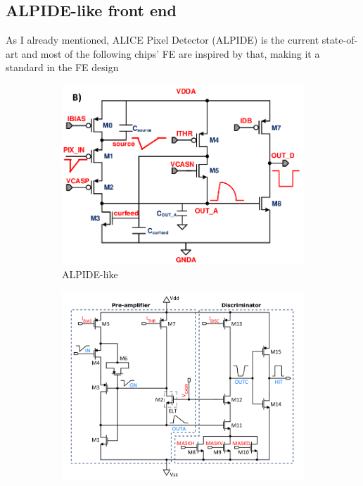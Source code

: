     \subsection{ALPIDE-like front end}
        As I already mentioned, ALICE Pixel Detector (ALPIDE) is the current state-of-art and most of the following chips' FE are inspired by that, making it a standard in the FE design
        \begin{figure}[h!]
            \begin{subfigure}{.5\textwidth}
            \centering
            \includegraphics[width=.98\linewidth]{figures/Monopix1/ALPIDE_FE.png}
            \caption{ALPIDE-like}
            \label{fig:ALPIDE-like}
            \end{subfigure}
            \begin{subfigure}{.5\textwidth}
            \centering
            \includegraphics[width=.98\linewidth]{figures/Monopix1/Monopix1_FE_circuit.png}
            \caption{}
            \label{fig:Monopix1_FE_circuit}
            \end{subfigure}
        \end{figure}
